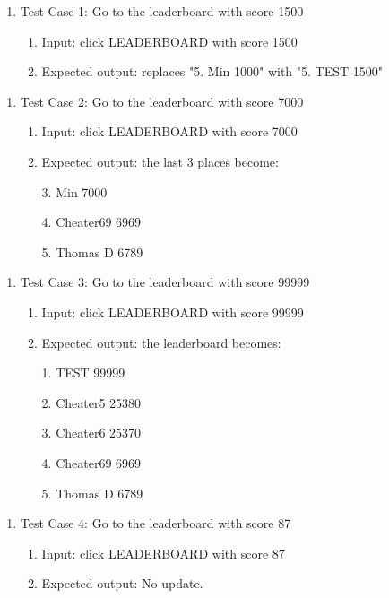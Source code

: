\documentclass[11pt]{article}
\begin{document}
    \begin{enumerate}
        \item Test Case 1: Go to the leaderboard with score 1500
        \begin{enumerate}
            \item  Input: click LEADERBOARD with score 1500
            \item  Expected output: replaces "5. Min 1000" with "5. TEST 1500"
        \end{enumerate}
    \end{enumerate}
    \begin{enumerate}
        \item Test Case 2: Go to the leaderboard with score 7000
        \begin{enumerate}
            \item  Input: click LEADERBOARD with score 7000
            \item  Expected output: the last 3 places become: 
    
                3. Min       7000

                4. Cheater69 6969

                5. Thomas D  6789
            
        \end{enumerate}
    \end{enumerate}
    \begin{enumerate}
        \item Test Case 3: Go to the leaderboard with score 99999
        \begin{enumerate}
            \item  Input: click LEADERBOARD with score 99999
            \item   Expected output: the leaderboard becomes:
         
                1. TEST     99999

                2. Cheater5 25380

                3. Cheater6 25370

                4. Cheater69 6969
                
                5. Thomas D  6789
       
        \end{enumerate}
    \end{enumerate}
    \begin{enumerate}
        \item Test Case 4: Go to the leaderboard with score 87
        \begin{enumerate}
            \item  Input: click LEADERBOARD with score 87
            \item  Expected output: No update.
        \end{enumerate}
    \end{enumerate}
\end{document}
